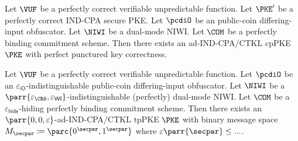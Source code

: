 \begin{theorem}[Informal]
    Let \(\VUF\) be a perfectly correct verifiable unpredictable function.
    Let \(\PKE'\) be a perfectly correct IND-CPA secure PKE.
    Let \(\pcdiO\) be an public-coin differing-input obfuscator.
    Let \(\NIWI\) be a dual-mode NIWI.
    Let \(\COM\) be a perfectly binding commitment scheme.
    Then there exists an ad-IND-CPA/CTKL cpPKE \(\PKE\) with perfect punctured key correctness.
\end{theorem}

\begin{theorem}\label{thm:construction-of-perfect-PK-correctness}
    Let \(\VUF\) be a perfectly correct verifiable unpredictable function.
    Let \(\pcdiO\) be an \(\varepsilon_{\textsf{iO}}\)-indistinguishable public-coin differing-input obfuscator.
    Let \(\NIWI\) be a \(\parr{\varepsilon_\CRS,\varepsilon_{\textsf{WI}}}\)-indistinguishable (perfectly) dual-mode NIWI.
    Let \(\COM\) be a \(\varepsilon_{\textsf{hide}}\)-hiding perfectly binding commitment scheme.
    Then there exists an \(\parr{0,0,\varepsilon}\)-ad-IND-CPA/CTKL tpPKE \(\PKE\) with binary message space \(M_\secpar \coloneq \parc{0^\secpar,1^\secpar}\) where \(\varepsilon\parr{\secpar} \leq ...\).
\end{theorem}

